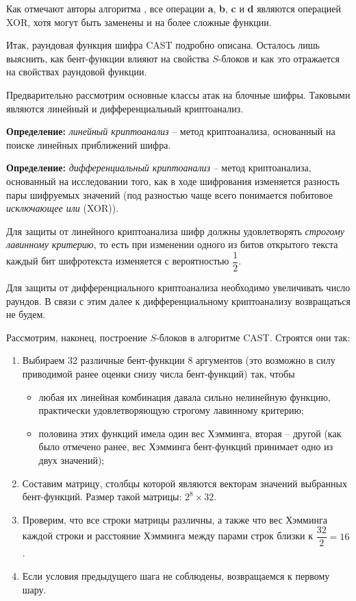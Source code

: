 \documentclass[12pt, a4paper, reqno]{article}
\begin{document}
    Как отмечают авторы алгоритма \cite{cast}, все операции \textbf{a}, \textbf{b}, \textbf{c} и
    \textbf{d} являются операцией XOR, хотя могут быть заменены и на более сложные функции.

    Итак, раундовая функция шифра CAST подробно описана. Осталось лишь выяснить, как бент-функции
    влияют на свойства $S$-блоков и как это отражается на свойствах раундовой функции.

    Предварительно рассмотрим основные классы атак на блочные шифры. Таковыми являются линейный и
    дифференциальный криптоанализ.

    \textbf{Определение:} \textit{линейный криптоанализ} -- метод криптоанализа, основанный на
    поиске линейных приближений шифра.

    \textbf{Определение:} \textit{дифференциальный криптоанализ} -- метод криптоанализа, основанный
    на исследовании того, как в ходе шифрования изменяется разность пары шифруемых значений (под
    разностью чаще всего понимается побитовое \textit{исключающее или} (XOR)).

    Для защиты от линейного криптоанализа шифр должны удовлетворять \textit{строгому лавинному
    критерию}, то есть при изменении одного из битов открытого текста каждый бит шифротекста
    изменяется с вероятностью $\dfrac{1}{2}$.

    Для защиты от дифференциального криптоанализа необходимо увеличивать число раундов. В связи с
    этим далее к дифференциальному криптоанализу возвращаться не будем.

    Рассмотрим, наконец, построение $S$-блоков в алгоритме CAST. Строятся они так:
    \begin{enumerate}
        \item Выбираем 32 различные бент-функции 8 аргументов (это возможно в силу приводимой ранее
              оценки снизу числа бент-функций) так, чтобы
        \begin{itemize}
            \item любая их линейная комбинация давала сильно нелинейную функцию, практически
                  удовлетворяющую строгому лавинному критерию;
            \item половина этих функций имела один вес Хэмминга, вторая -- другой (как было отмечено
                  ранее, вес Хэмминга бент-функций принимает одно из двух значений);
        \end{itemize}
        \item Составим матрицу, столбцы которой являются векторам значений выбранных бент-функций.
              Размер такой матрицы: $2^8 \times 32$.
        \item Проверим, что все строки матрицы различны, а также что вес Хэмминга каждой строки и
              расстояние Хэмминга между парами строк близки к $\dfrac{32}{2} = 16$.
        \item Если условия предыдущего шага не соблюдены, возвращаемся к первому шару.
    \end{enumerate}
\end{document}
